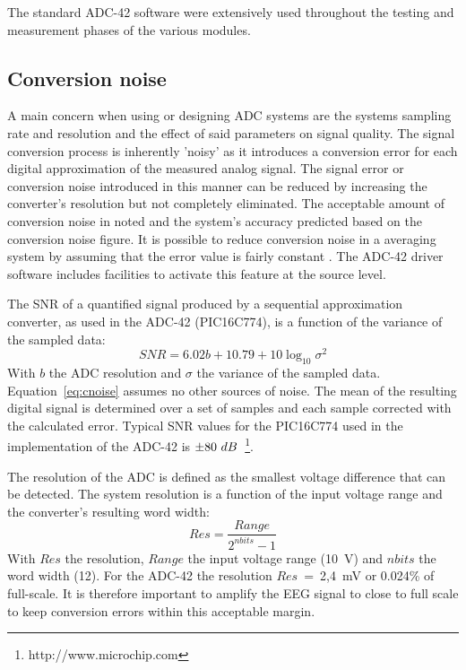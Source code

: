 The standard ADC-42 software were extensively used throughout the
testing and measurement phases of the various modules.

\subsection{Conversion noise}

A main concern when using or designing ADC systems are the systems
sampling rate and resolution and the effect of said parameters on
signal quality. The signal conversion process is inherently 'noisy' as
it introduces a conversion error for each digital approximation of the
measured analog signal. The signal error or conversion noise
introduced in this manner can be reduced by increasing the converter's
resolution but not completely eliminated. The acceptable amount of
conversion noise in noted and the system's accuracy predicted based on
the conversion noise figure. It is possible to reduce conversion noise
in a averaging system by assuming that the error value is fairly
constant \cite{roundoff-error}. The ADC-42 driver software includes
facilities to activate this feature at the source level.

The SNR of a quantified signal produced by a sequential approximation
converter, as used in the ADC-42 (PIC16C774), is a function of the
variance of the sampled data:
\begin{equation}
	SNR = 6.02b + 10.79 +10\log_{10}\sigma^2
	\label{eq:cnoise}
\end{equation}
With $b$ the ADC resolution and $\sigma$ the variance of the sampled
data. Equation~\ref{eq:cnoise} assumes no other sources of noise. The
mean of the resulting digital signal is determined over a set of
samples and each sample corrected with the calculated error. Typical
SNR values for the PIC16C774 used in the implementation of the ADC-42
is $\pm\/80~dB$~\footnote{http://www.microchip.com}.

The resolution of the ADC is defined as the smallest voltage
difference that can be detected. The system resolution is a function
of the input voltage range and the converter's resulting word width:
\begin{equation}
	Res = \frac{Range}{ 2^{nbits}- 1}
	\label{eq:resolution}
\end{equation}
With $Res$ the resolution, $Range$ the input voltage range (10~V) and
$nbits$ the word width (12). For the ADC-42 the resolution
$Res$~=~2,4~mV or 0.024\% of full-scale. It is therefore important to
amplify the EEG signal to close to full scale to keep conversion
errors within this acceptable margin.

